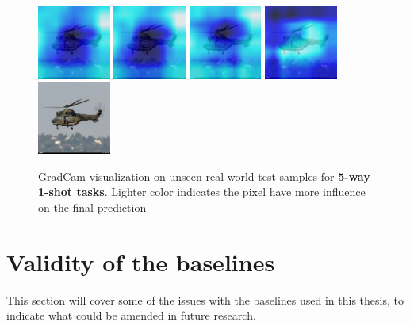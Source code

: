 \begin{figure}[H]
  {\includegraphics[height=2.4cm, width=2.4cm]{images/real-images/gradcam/5-1/3/Heat_map_of_iterations_0.png}}
  {\includegraphics[height=2.4cm, width=2.4cm]{images/real-images/gradcam/5-1/3/Heat_map_of_iterations_1.png}}
  {\includegraphics[height=2.4cm, width=2.4cm]{images/real-images/gradcam/5-1/3/Heat_map_of_iterations_3.png}}
%
  {\includegraphics[height=2.4cm, width=2.4cm]{images/real-images/gradcam/5-1/3/Heat_map_of_iterations_5.png}}
  {\includegraphics[height=2.4cm, width=2.4cm]{images/real-images/gradcam/5-1/3/Test_Images.png}}
  
  \caption{GradCam-visualization on unseen real-world test samples for \textbf{5-way 1-shot tasks}. Lighter color indicates the pixel have more influence on the final prediction}
  \label{grad-cam-real-5-1}
\end{figure}

\section{Validity of the baselines}
This section will cover some of the issues with the baselines used in this thesis, to indicate what could be amended in future research.

